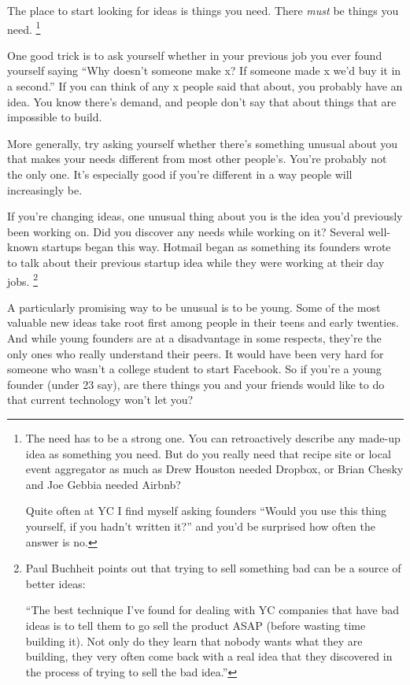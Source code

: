 \documentclass[12pt]{book}
\begin{document}
The place to start looking for ideas is things you need. There
\emph{must} be things you need. \footnote{The need has to be a strong one. You can retroactively describe
any made-up idea as something you need. But do you really need that
recipe site or local event aggregator as much as Drew Houston needed
Dropbox, or Brian Chesky and Joe Gebbia needed Airbnb?

Quite often at YC I find myself asking founders ``Would you use this
thing yourself, if you hadn't written it?'' and you'd be surprised how
often the answer is no.}

One good trick is to ask yourself whether in your previous job you ever
found yourself saying ``Why doesn't someone make x? If someone made x
we'd buy it in a second.'' If you can think of any x people said that
about, you probably have an idea. You know there's demand, and people
don't say that about things that are impossible to build.

More generally, try asking yourself whether there's something unusual
about you that makes your needs different from most other people's.
You're probably not the only one. It's especially good if you're
different in a way people will increasingly be.

If you're changing ideas, one unusual thing about you is the idea you'd
previously been working on. Did you discover any needs while working on
it? Several well-known startups began this way. Hotmail began as
something its founders wrote to talk about their previous startup idea
while they were working at their day jobs. \footnote{Paul Buchheit points out that trying to sell something bad can
be a source of better ideas:

``The best technique I've found for dealing with YC companies that have
bad ideas is to tell them to go sell the product ASAP (before wasting
time building it). Not only do they learn that nobody wants what they
are building, they very often come back with a real idea that they
discovered in the process of trying to sell the bad idea.''}

A particularly promising way to be unusual is to be young. Some of the
most valuable new ideas take root first among people in their teens and
early twenties. And while young founders are at a disadvantage in some
respects, they're the only ones who really understand their peers. It
would have been very hard for someone who wasn't a college student to
start Facebook. So if you're a young founder (under 23 say), are there
things you and your friends would like to do that current technology
won't let you?
\end{document}
